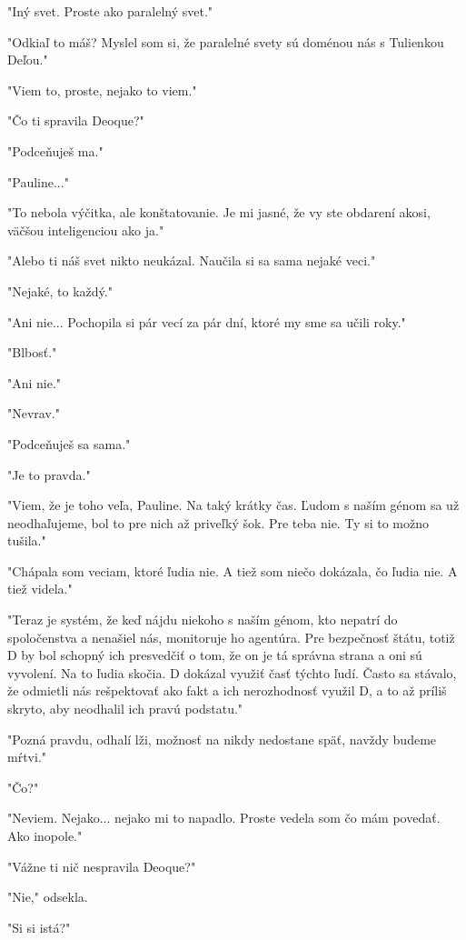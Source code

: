 \documentclass{book}
\begin{document}
"$ $Iný svet. Proste ako paralelný svet."$ $ 

"$ $Odkiaľ to máš? Myslel som si, že paralelné svety sú doménou nás s Tulienkou Deľou."$ $ 

"$ $Viem to, proste, nejako to viem."$ $ 

"$ $Čo ti spravila Deoque?"$ $ 

"$ $Podceňuješ ma."$ $ 

"$ $Pauline..."$ $ 

"$ $To nebola výčitka, ale konštatovanie. Je mi jasné, že vy ste obdarení akosi, väčšou inteligenciou ako ja."$ $ 

"$ $Alebo ti náš svet nikto neukázal. Naučila si sa sama nejaké veci."$ $ 

"$ $Nejaké, to každý."$ $ 

"$ $Ani nie... Pochopila si pár vecí za pár dní, ktoré my sme sa učili roky."$ $ 

"$ $Blbosť."$ $ 

"$ $Ani nie."$ $ 

"$ $Nevrav."$ $ 

"$ $Podceňuješ sa sama."$ $ 

"$ $Je to pravda."$ $ 

"$ $Viem, že je toho veľa, Pauline. Na taký krátky čas. Ľudom s naším génom sa už neodhaľujeme, bol to pre nich až priveľký šok. Pre teba nie. Ty si to možno tušila."$ $ 

"$ $Chápala som veciam, ktoré ľudia nie. A tiež som niečo dokázala, čo ľudia nie. A tiež videla."$ $ 

"$ $Teraz je systém, že keď nájdu niekoho s naším génom, kto nepatrí do spoločenstva a nenašiel nás, monitoruje ho agentúra. Pre bezpečnosť štátu, totiž D by bol schopný ich presvedčiť o tom, že on je tá správna strana a oni sú vyvolení. Na to ľudia skočia. D dokázal využiť časť týchto ľudí. Často sa stávalo, že odmietli nás rešpektovať ako fakt a ich nerozhodnosť využil D, a to až príliš skryto, aby neodhalil ich pravú podstatu."$ $ 

"$ $Pozná pravdu, odhalí lži, možnosť na nikdy nedostane späť, navždy budeme mŕtvi."$ $ 

"$ $Čo?"$ $ 

"$ $Neviem. Nejako... nejako mi to napadlo. Proste vedela som čo mám povedať. Ako inopole."$ $ 

"$ $Vážne ti nič nespravila Deoque?"$ $ 

"$ $Nie,"$ $  odsekla.

"$ $Si si istá?"$ $ 
\end{document}
